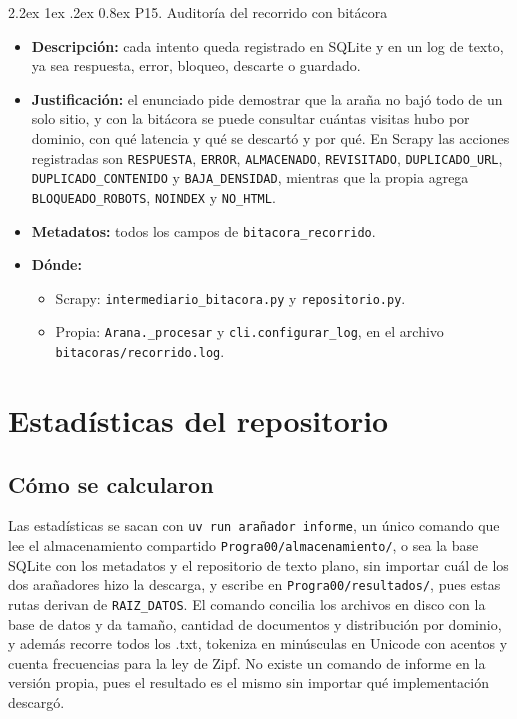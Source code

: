 \documentclass[11pt,spanish]{article}
\makeatletter
\renewcommand\paragraph{\@startsection{paragraph}{4}{\z@}%
  {2.2ex \@plus1ex \@minus.2ex}%
  {0.8ex}%
  {\normalfont\normalsize\bfseries}}
\makeatother
\begin{document}
\paragraph{P15. Auditoría del recorrido con bitácora}

\begin{itemize}[label=\textbullet, leftmargin=*]
    \item \textbf{Descripción:} cada intento queda registrado en SQLite y en un log de texto, ya sea respuesta, error, bloqueo, descarte o guardado.
    \item \textbf{Justificación:} el enunciado pide demostrar que la araña no bajó todo de un solo sitio, y con la bitácora se puede consultar cuántas visitas hubo por dominio, con qué latencia y qué se descartó y por qué. En Scrapy las acciones registradas son \texttt{RESPUESTA}, \texttt{ERROR}, \texttt{ALMACENADO}, \texttt{REVISITADO}, \texttt{DUPLICADO\_URL}, \texttt{DUPLICADO\_CONTENIDO} y \texttt{BAJA\_DENSIDAD}, mientras que la propia agrega \texttt{BLOQUEADO\_ROBOTS}, \texttt{NOINDEX} y \texttt{NO\_HTML}.
    \item \textbf{Metadatos:} todos los campos de \texttt{bitacora\_recorrido}.
    \item \textbf{Dónde:}
    \begin{itemize}[label=--, leftmargin=*]
        \item Scrapy: \texttt{intermediario\_bitacora.py} y \texttt{repositorio.py}.
        \item Propia: \texttt{Arana.\_procesar} y \texttt{cli.configurar\_log}, en el archivo \texttt{bitacoras/recorrido.log}.
    \end{itemize}
\end{itemize}

\section{Estadísticas del repositorio}

\subsection{Cómo se calcularon}

Las estadísticas se sacan con \texttt{uv run arañador informe}, un único comando que lee el almacenamiento compartido \texttt{Progra00/almacenamiento/}, o sea la base SQLite con los metadatos y el repositorio de texto plano, sin importar cuál de los dos arañadores hizo la descarga, y escribe en \texttt{Progra00/resultados/}, pues estas rutas derivan de \texttt{RAIZ\_DATOS}. El comando concilia los archivos en disco con la base de datos y da tamaño, cantidad de documentos y distribución por dominio, y además recorre todos los .txt, tokeniza en minúsculas en Unicode con acentos y cuenta frecuencias para la ley de Zipf. No existe un comando de informe en la versión propia, pues el resultado es el mismo sin importar qué implementación descargó.
\end{document}
